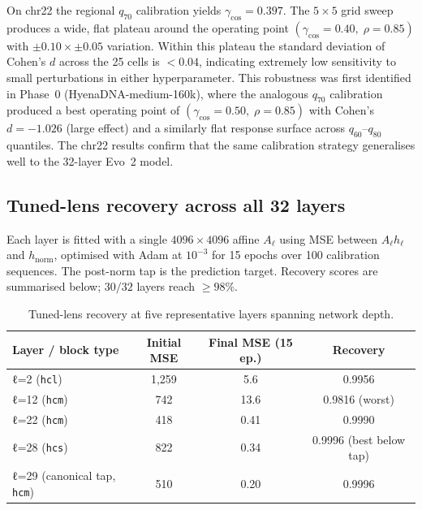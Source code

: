 \documentclass[12pt]{article}
\theoremstyle{plain}
\theoremstyle{definition}
\theoremstyle{remark}
\newcommand{\hnorm}{h_{\mathrm{norm}}}
\begin{document}
On chr22 the regional $q_{70}$ calibration yields
$\gamma_{\cos} = 0.397$. The $5\times 5$ grid sweep produces a wide,
flat plateau around the operating point
$(\gamma_{\cos}=0.40,\; \rho=0.85)$ with $\pm 0.10 \times \pm 0.05$
variation. Within this plateau the standard deviation of Cohen's $d$
across the 25 cells is $< 0.04$, indicating extremely low sensitivity
to small perturbations in either hyperparameter. This robustness was
first identified in Phase~0 (HyenaDNA-medium-160k), where the analogous
$q_{70}$ calibration produced a best operating point of
$(\gamma_{\cos}=0.50,\; \rho=0.85)$ with Cohen's $d = -1.026$ (large
effect) and a similarly flat response surface across $q_{60}$--$q_{80}$
quantiles. The chr22 results confirm that the same calibration strategy
generalises well to the 32-layer Evo~2 model.

\subsection{Tuned-lens recovery across all 32 layers}
\label{app:tuned-lens}

Each layer is fitted with a single $4096\times 4096$ affine $A_{\ell}$
using MSE between $A_{\ell} h_{\ell}$ and $\hnorm$, optimised with Adam
at $10^{-3}$ for 15 epochs over 100 calibration sequences. The
post-norm tap is the prediction target. Recovery scores are summarised
below; $30/32$ layers reach $\ge 98\%$.

\begin{table}[h]
\caption{Tuned-lens recovery at five representative layers spanning
network depth.}
\label{tab:tuned-lens}
\centering
\small
\begin{tabular}{@{}lccc@{}}
\toprule
Layer / block type & Initial MSE & Final MSE (15 ep.) & Recovery \\
\midrule
ℓ=2 (\texttt{hcl}) & 1,259 & 5.6 & 0.9956 \\
ℓ=12 (\texttt{hcm}) & 742 & 13.6 & 0.9816 (worst) \\
ℓ=22 (\texttt{hcm}) & 418 & 0.41 & 0.9990 \\
ℓ=28 (\texttt{hcs}) & 822 & 0.34 & 0.9996 (best below tap) \\
ℓ=29 (canonical tap, \texttt{hcm}) & 510 & 0.20 & 0.9996 \\
\bottomrule
\end{tabular}
\end{table}

\end{document}
